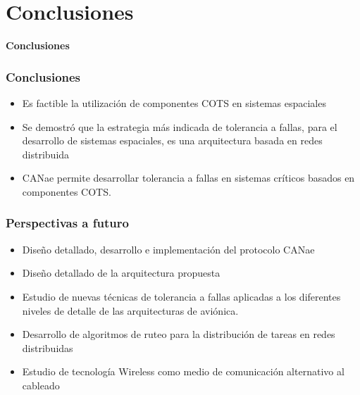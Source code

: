 \section{Conclusiones}
\begin{frame}
	\centering
	\LARGE \textbf{Conclusiones}
\end{frame}

\begin{frame}
	\frametitle{Conclusiones}
	\begin{itemize}
		\item Es factible la utilización de componentes COTS en sistemas espaciales
		\item Se demostró que la estrategia más indicada de tolerancia a fallas, para el desarrollo de sistemas espaciales, es una arquitectura basada en redes distribuida
		\item CANae permite desarrollar tolerancia a fallas en sistemas críticos basados en componentes COTS. 
	\end{itemize}
\end{frame}

\begin{frame}
	\frametitle{Perspectivas a futuro}
	\begin{itemize}
		\item Diseño detallado, desarrollo e  implementación del protocolo CANae
		\item Diseño detallado de la arquitectura propuesta
		\item Estudio de nuevas técnicas de tolerancia a fallas aplicadas a los diferentes niveles de detalle de las arquitecturas de aviónica. 
		\item Desarrollo de algoritmos de ruteo para la distribución de tareas en redes distribuidas
		\item Estudio de tecnología Wireless como medio de comunicación alternativo al cableado
	\end{itemize}
\end{frame}